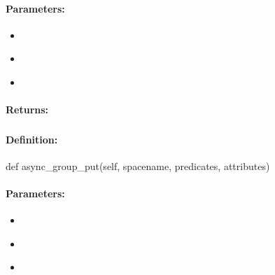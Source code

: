 \paragraph{Parameters:}
\begin{itemize}[noitemsep]
\item {}\\

\item {}\\

\item {}\\

\end{itemize}

\paragraph{Returns:}


\pagebreak
\subsubsection{}
\label{api:python:async_group_put}


\paragraph{Definition:}
\begin{pythoncode}
def async_group_put(self, spacename, predicates, attributes)
\end{pythoncode}

\paragraph{Parameters:}
\begin{itemize}[noitemsep]
\item {}\\

\item {}\\

\item {}\\

\end{itemize}


